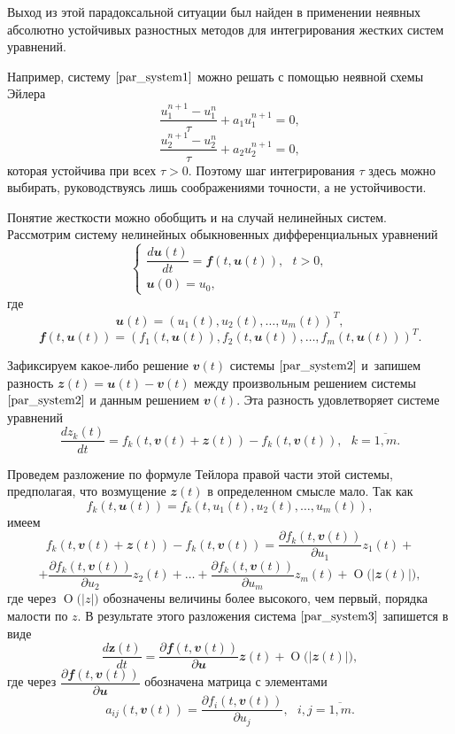 \documentclass[11pt,a4paper,twoside]{report}
\numberwithin{equation}{section}
\theoremstyle{definition}
\theoremstyle{plain}
\newcommand{\bigO}[1]{\ensuremath{\operatorname{O}\bigl(#1\bigr)}}
\newcommand{\vfunc}[1]{\mathbfit{#1}}
\begin{document}
Выход из этой парадоксальной ситуации был найден в применении неявных
абсолютно устойчивых разностных методов для интегрирования жестких систем уравнений.

Например, систему $\eqref{par_system1}$ можно решать с помощью неявной схемы Эйлера
%
$$
    \dfrac{u_1^{n+1} - u_1^n}{\tau} + a_1u_1^{n+1} = 0,
$$
%
$$
    \dfrac{u_2^{n+1} - u_2^n}{\tau} + a_2u_2^{n+1} = 0,
$$
%
которая устойчива при всех $\tau>0$. Поэтому шаг интегрирования $\tau$
здесь можно выбирать, руководствуясь лишь соображениями точности, а не
устойчивости.

Понятие жесткости можно обобщить и на случай нелинейных систем.
Рассмотрим систему нелинейных обыкновенных дифференциальных уравнений
%
\begin{equation}
%
    \label{par_system2}
    \begin{cases}
        \dfrac{d\vfunc{u}(t)}{dt} = \vfunc{f}(t, \vfunc{u}(t)),~~~t > 0,\\
        \vfunc{u}(0)=u_0,
    \end{cases}
%
\end{equation}
%
где
%
$$
    \vfunc{u}(t)=\left(u_1(t), u_2(t),\ldots, u_m(t)\right)^T,
$$
%
$$
    \vfunc{f}(t, \vfunc{u}(t)) = \left(f_1(t, \vfunc{u}(t)), f_2(t, \vfunc{u}(t)),
    \ldots, f_m(t, \vfunc{u}(t))\right)^T.
$$
%

Зафиксируем
какое-либо решение $\vfunc{v}(t)$ системы $\eqref{par_system2}$ и~запишем
разность $\vfunc{z}(t)=\vfunc{u}(t)-\vfunc{v}(t)$ между произвольным
решением системы $\eqref{par_system2}$ и данным решением $\vfunc{v}(t)$.
Эта разность удовлетворяет системе уравнений
%
\begin{equation}
%
    \label{par_system3}
    \dfrac{dz_k(t)}{dt} = f_k(t, \vfunc{v}(t) +
    \vfunc{z}(t)) - f_k(t, \vfunc{v}(t)),~~~k=\overline{1,m}.
%
\end{equation}
%

Проведем разложение по формуле Тейлора правой части этой системы,
предполагая, что возмущение $\vfunc{z}(t)$ в определенном смысле мало. Так как
%
$$
    f_k(t, \vfunc{u}(t)) = f_k(t, u_1(t), u_2(t), \ldots, u_m(t)),
$$
%
имеем
%
$$
    f_k(t, \vfunc{v}(t) + \vfunc{z}(t)) - f_k(t, \vfunc{v}(t)) =
    \dfrac{\partial f_k(t, \vfunc{v}(t))}{\partial u_1}z_1(t) +
$$
%
$$
    + \dfrac{\partial f_k(t, \vfunc{v}(t))}{\partial u_2}z_2(t) +
    \ldots + \dfrac{\partial f_k(t, \vfunc{v}(t))}{\partial u_m}z_m(t)
    + \bigO{|\vfunc{z}(t)|},
$$
%
где через $\bigO{|z|}$ обозначены величины более высокого, чем первый,
порядка малости по $z$. В результате этого разложения система
$\eqref{par_system3}$ запишется в виде
%
\begin{equation}
%
    \label{par_system4}
    \dfrac{d\textbf{z}(t)}{dt} = \dfrac{\partial
    \vfunc{f}(t, \vfunc{v}(t))}{\partial \vfunc{u}}\vfunc{z}(t)
    +\bigO{|\vfunc{z}(t)|},
%
\end{equation}
%
где через $\dfrac{\partial
    \vfunc{f}(t, \vfunc{v}(t))}{\partial \vfunc{u}}$
обозначена матрица с элементами
%
$$
    a_{ij}
    (t,\vfunc{v}(t)) = \dfrac{\partial f_i(t, \vfunc{v}(t))}
    {\partial u_j},~~~i,j=\overline{1,m}.
$$
%
\end{document}
